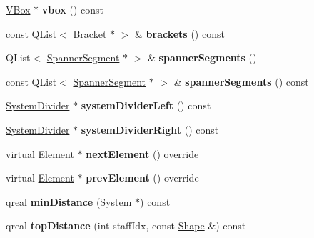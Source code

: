 \begin{DoxyCompactItemize}
\hyperlink{class_ms_1_1_v_box}{V\+Box} $\ast$ {\bfseries vbox} () const
\item 
\mbox{\label{class_ms_1_1_system_a336fab19d60f80f80bfb305318445e23}} 
const Q\+List$<$ \hyperlink{class_ms_1_1_bracket}{Bracket} $\ast$ $>$ \& {\bfseries brackets} () const
\item 
\mbox{\label{class_ms_1_1_system_a146014b5067b0027c6163b3d2e5d8b07}} 
Q\+List$<$ \hyperlink{class_ms_1_1_spanner_segment}{Spanner\+Segment} $\ast$ $>$ \& {\bfseries spanner\+Segments} ()
\item 
\mbox{\label{class_ms_1_1_system_af7206517aaac07599492de36dc9304be}} 
const Q\+List$<$ \hyperlink{class_ms_1_1_spanner_segment}{Spanner\+Segment} $\ast$ $>$ \& {\bfseries spanner\+Segments} () const
\item 
\mbox{\label{class_ms_1_1_system_a5cb93da114779e0e9811e2e6d9322e2e}} 
\hyperlink{class_ms_1_1_system_divider}{System\+Divider} $\ast$ {\bfseries system\+Divider\+Left} () const
\item 
\mbox{\label{class_ms_1_1_system_af04d55563537c07d6b993edbf897f5fd}} 
\hyperlink{class_ms_1_1_system_divider}{System\+Divider} $\ast$ {\bfseries system\+Divider\+Right} () const
\item 
\mbox{\label{class_ms_1_1_system_ad27a858138b083a9778e596f7e24b083}} 
virtual \hyperlink{class_ms_1_1_element}{Element} $\ast$ {\bfseries next\+Element} () override
\item 
\mbox{\label{class_ms_1_1_system_aac0c855a0130c2a9ae82217f1bb2aefc}} 
virtual \hyperlink{class_ms_1_1_element}{Element} $\ast$ {\bfseries prev\+Element} () override
\item 
\mbox{\label{class_ms_1_1_system_a1ca675ae448b1850c924d042b3f39691}} 
qreal {\bfseries min\+Distance} (\hyperlink{class_ms_1_1_system}{System} $\ast$) const
\item 
\mbox{\label{class_ms_1_1_system_aa9813a606196c63538f3dc78757276b3}} 
qreal {\bfseries top\+Distance} (int staff\+Idx, const \hyperlink{class_ms_1_1_shape}{Shape} \&) const

\end{DoxyCompactItemize}
